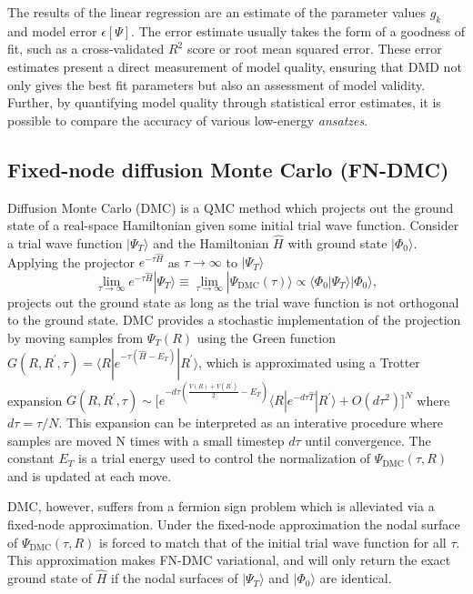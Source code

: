 \documentclass[12pt]{article}
\begin{document}
The results of the linear regression are an estimate of the parameter values $g_k$ and model error $\epsilon[\Psi]$.
The error estimate usually takes the form of a goodness of fit, such as a cross-validated $R^2$ score or root mean squared error.
These error estimates present a direct measurement of model quality, ensuring that DMD not only gives the best fit parameters but also an assessment of model validity.
Further, by quantifying model quality through statistical error estimates, it is possible to compare the accuracy of various low-energy \textit{ansatzes}.

\subsection{Fixed-node diffusion Monte Carlo (FN-DMC)}
Diffusion Monte Carlo (DMC) is a QMC method which projects out the ground state of a real-space Hamiltonian given some initial trial wave function.
Consider a trial wave function $|\Psi_T\rangle$ and the Hamiltonian $\hat{H}$ with ground state $|\Phi_0\rangle$. 
Applying the projector $e^{-\tau \hat{H}}$ as $\tau \rightarrow \infty$ to $|\Psi_T \rangle$
\begin{equation}
\lim_{\tau \rightarrow \infty} e^{-\tau \hat{H}} |\Psi_T\rangle 
\equiv \lim_{\tau \rightarrow \infty} |\Psi_\text{DMC}(\tau)\rangle \propto \langle \Phi_0|\Psi_T\rangle |\Phi_0\rangle,
\end{equation}
projects out the ground state as long as the trial wave function is not orthogonal to the ground state. 
DMC provides a stochastic implementation of the projection by moving samples from $\Psi_T(R)$ using the Green function $G(R, R^\prime, \tau) = \langle R | e^{-\tau(\hat{H} - E_T)} | R^\prime \rangle$, which is approximated using a Trotter expansion $G(R, R^\prime, \tau) \sim \Big[e^{-d\tau(\frac{V(R) + V(R^\prime)}{2} - E_T)} \langle R| e^{-d\tau\hat{T}}|R^\prime \rangle + O(d\tau^2) \Big]^N $ 
where $d\tau = \tau/N$.
This expansion can be interpreted as an interative procedure where samples are moved N times with a small timestep $d\tau$ until convergence.
The constant $E_T$ is a trial energy used to control the normalization of $\Psi_\text{DMC}(\tau, R)$ and is updated at each move.

DMC, however, suffers from a fermion sign problem which is alleviated via a fixed-node approximation.
Under the fixed-node approximation the nodal surface of $\Psi_\text{DMC}(\tau, R)$ is forced to match that of the initial trial wave function for all $\tau$.
This approximation makes FN-DMC variational, and will only return the exact ground state of $\hat{H}$ if the nodal surfaces of $|\Psi_T\rangle$ and $|\Phi_0\rangle$ are identical.
\end{document}
